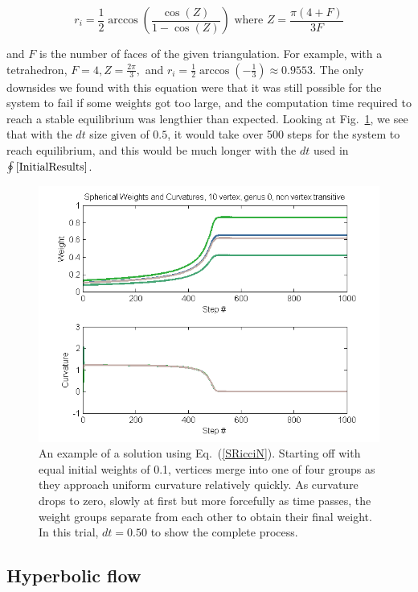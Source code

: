 \documentclass[12pt]{article}
\begin{document}
$$r_i = \frac{1}{2}\arccos(\frac{\cos(Z)}{1 - \cos(Z)}) \mbox{ where } Z = \frac{\pi(4 + F)}{3F}$$

\noindent and $F$ is the number of faces of the given triangulation. For example, with a tetrahedron, $F = 4, Z = \frac{2\pi}{3},$ and $r_i = \frac{1}{2}\arccos(-\frac{1}{3}) \approx 0.9553.$ The only downsides we found with this equation were that it was still possible for the system to fail if some weights got too large, and the computation time required to reach a stable equilibrium was lengthier than expected. Looking at Fig.~\ref{SphGood}, we see that with the $dt$ size given of $0.5$, it would take over 500 steps for the system to reach equilibrium, and this would be much longer with the $dt$ used in $\oint\ref{InitialResults}$.  

\begin{figure}[ht]
\centering
\includegraphics[scale = 0.8]{Pictures/SphG0V10.png}
\caption{An example of a solution using Eq.~(\ref{SRicciN}). Starting off with equal initial weights of 0.1, vertices merge into one of four groups as they approach uniform curvature relatively quickly. As curvature drops to zero, slowly at first but more forcefully as time passes, the weight groups separate from each other to obtain their final weight. In this trial, $dt = 0.50$ to show the complete process.}
\label{SphGood}  
\end{figure}

\subsection{Hyperbolic flow}
\end{document}
